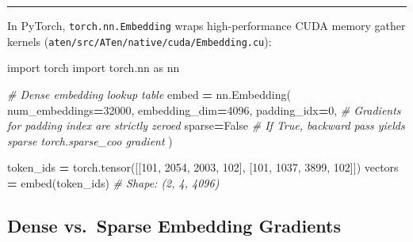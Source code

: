 \documentclass[
  letterpaper,
]{scrbook}
\newenvironment{Shaded}{\begin{snugshade}}{\end{snugshade}}
\newcommand{\CommentTok}[1]{\textcolor[rgb]{0.56,0.35,0.01}{\textit{#1}}}
\newcommand{\DecValTok}[1]{\textcolor[rgb]{0.00,0.00,0.81}{#1}}
\newcommand{\ImportTok}[1]{#1}
\newcommand{\NormalTok}[1]{#1}
\newcommand{\OperatorTok}[1]{\textcolor[rgb]{0.81,0.36,0.00}{\textbf{#1}}}
\newcommand{\VariableTok}[1]{\textcolor[rgb]{0.00,0.00,0.00}{#1}}
\begin{document}
\begin{center}\rule{0.5\linewidth}{0.5pt}\end{center}

\begin{tcolorbox}[enhanced jigsaw, arc=.35mm, bottomrule=.15mm, bottomtitle=1mm, breakable, colback=white, colbacktitle=quarto-callout-note-color!10!white, colframe=quarto-callout-note-color-frame, coltitle=black, left=2mm, leftrule=.75mm, opacityback=0, opacitybacktitle=0.6, rightrule=.15mm, title=\textcolor{quarto-callout-note-color}{\faInfo}\hspace{0.5em}{PyTorch Systems Bridge: \texttt{torch.nn.Embedding}, Sparse Gradients,
and \texttt{EmbeddingBag}}, titlerule=0mm, toprule=.15mm, toptitle=1mm]

In PyTorch, \texttt{torch.nn.Embedding} wraps high-performance CUDA
memory gather kernels (\texttt{aten/src/ATen/native/cuda/Embedding.cu}):

\begin{Shaded}
\begin{Highlighting}[]
\ImportTok{import}\NormalTok{ torch}
\ImportTok{import}\NormalTok{ torch.nn }\ImportTok{as}\NormalTok{ nn}

\CommentTok{\# Dense embedding lookup table}
\NormalTok{embed }\OperatorTok{=}\NormalTok{ nn.Embedding(}
\NormalTok{    num\_embeddings}\OperatorTok{=}\DecValTok{32000}\NormalTok{,}
\NormalTok{    embedding\_dim}\OperatorTok{=}\DecValTok{4096}\NormalTok{,}
\NormalTok{    padding\_idx}\OperatorTok{=}\DecValTok{0}\NormalTok{,      }\CommentTok{\# Gradients for padding index are strictly zeroed}
\NormalTok{    sparse}\OperatorTok{=}\VariableTok{False}        \CommentTok{\# If True, backward pass yields sparse torch.sparse\_coo gradient}
\NormalTok{)}

\NormalTok{token\_ids }\OperatorTok{=}\NormalTok{ torch.tensor([[}\DecValTok{101}\NormalTok{, }\DecValTok{2054}\NormalTok{, }\DecValTok{2003}\NormalTok{, }\DecValTok{102}\NormalTok{], [}\DecValTok{101}\NormalTok{, }\DecValTok{1037}\NormalTok{, }\DecValTok{3899}\NormalTok{, }\DecValTok{102}\NormalTok{]])}
\NormalTok{vectors }\OperatorTok{=}\NormalTok{ embed(token\_ids)  }\CommentTok{\# Shape: (2, 4, 4096)}
\end{Highlighting}
\end{Shaded}

\subsection{Dense vs.~Sparse Embedding
Gradients}\label{dense-vs.-sparse-embedding-gradients}


\end{tcolorbox}
\end{document}
